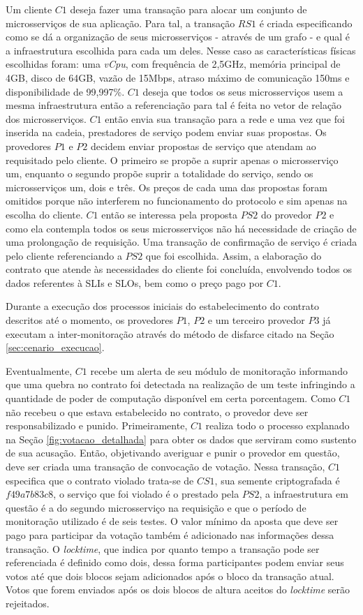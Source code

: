 Um cliente $C1$ deseja fazer uma transação para alocar um conjunto de microsserviços de sua aplicação. Para tal, a transação $RS1$ é criada especificando como se dá a organização de seus microsserviços - através de um grafo - e qual é a infraestrutura escolhida para cada um deles. Nesse caso as características físicas escolhidas foram: uma \textit{vCpu}, com frequência de 2,5GHz, memória principal de 4GB, disco de 64GB, vazão de 15Mbps, atraso máximo de comunicação 150ms e disponibilidade de 99,997\%. $C1$ deseja que todos os seus microsserviços usem a mesma infraestrutura então a referenciação para tal é feita no vetor de relação dos microsserviços. $C1$ então envia sua transação para a rede e uma vez que foi inserida na cadeia, prestadores de serviço podem enviar suas propostas. Os provedores $P1$ e $P2$ decidem enviar propostas de serviço que atendam ao requisitado pelo cliente. O primeiro se propõe a suprir apenas o microsserviço um, enquanto o segundo propõe suprir a totalidade do serviço, sendo os microsserviços um, dois e três. Os preços de cada uma das propostas foram omitidos porque não interferem no funcionamento do protocolo e sim apenas na escolha do cliente. $C1$ então se interessa pela proposta $PS2$ do provedor $P2$ e como ela contempla todos os seus microsserviços não há necessidade de criação de uma prolongação de requisição. Uma transação de confirmação de serviço é criada pelo cliente referenciando a $PS2$ que foi escolhida. Assim, a elaboração do contrato que atende às necessidades do cliente foi concluída, envolvendo todos os dados referentes à \acp{SLI} e \acp{SLO}, bem como o preço pago por $C1$.

%
Durante a execução dos processos iniciais do estabelecimento do contrato descritos até o momento, os provedores $P1$, $P2$ e um terceiro provedor $P3$ já executam a inter-monitoração através do método de disfarce citado na Seção \ref{sec:cenario_execucao}.

%
Eventualmente, $C1$ recebe um alerta de seu módulo de monitoração informando que uma quebra no contrato foi detectada na realização de um teste infringindo a quantidade de poder de computação disponível em certa porcentagem. Como $C1$ não recebeu o que estava estabelecido no contrato, o provedor deve ser responsabilizado e punido. Primeiramente, $C1$ realiza todo o processo explanado na Seção \ref{fig:votacao_detalhada} para obter os dados que serviram como sustento de sua acusação. Então, objetivando averiguar e punir o provedor em questão, deve ser criada uma transação de convocação de votação. Nessa transação, $C1$ especifica que o contrato violado trata-se de $CS1$, sua semente criptografada é $f49a7b83c8$,  o serviço que foi violado é o prestado pela $PS2$, a infraestrutura em questão é a do segundo microsserviço na requisição e que o período de monitoração utilizado é de seis testes. O valor mínimo da aposta que deve ser pago para participar da votação também é adicionado nas informações dessa transação. O \textit{locktime}, que indica por quanto tempo a transação pode ser referenciada é definido como dois, dessa forma participantes podem enviar seus votos até que dois blocos sejam adicionados após o bloco da transação atual. Votos que forem enviados após os dois blocos de altura aceitos do \textit{locktime} serão rejeitados.

